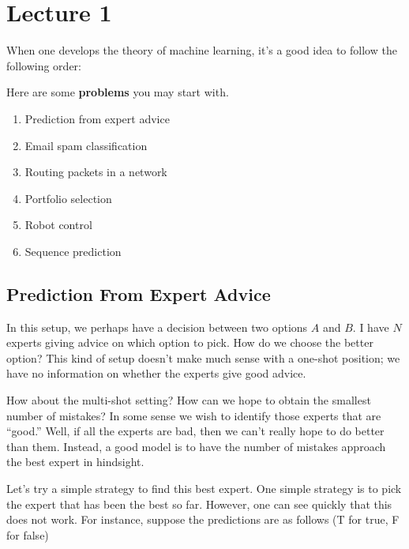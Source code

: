 \section{Lecture 1}
When one develops the theory of machine learning, it's a good idea to follow the
following order:

\begin{center}
\end{center}
\begin{example}
    Here are some \textbf{problems} you may start with.
    \begin{enumerate}
        \item Prediction from expert advice
        \item Email spam classification
        \item Routing packets in a network
        \item Portfolio selection
        \item Robot control
        \item Sequence prediction
    \end{enumerate}
\end{example}

\subsection{Prediction From Expert Advice}
In this setup, we perhaps have a decision between two options $A$ and $B$. I
have $N$ experts giving advice on which option to pick. How do we choose the better option?
This kind of setup doesn't make much sense with a one-shot position; we have no information
on whether the experts give good advice.

How about the multi-shot setting? How can we hope to obtain the smallest number of mistakes?
In some sense we wish to identify those experts that are ``good.'' Well, if all the experts
are bad, then we can't really hope to do better than them. Instead,
a good model is to have the number of mistakes approach the best expert in hindsight.

Let's try a simple strategy to find this best expert. One simple strategy is to pick the expert that
has been the best so far. However, one can see quickly that this does not work. For instance, suppose
the predictions are as follows (T for true, F for false)

